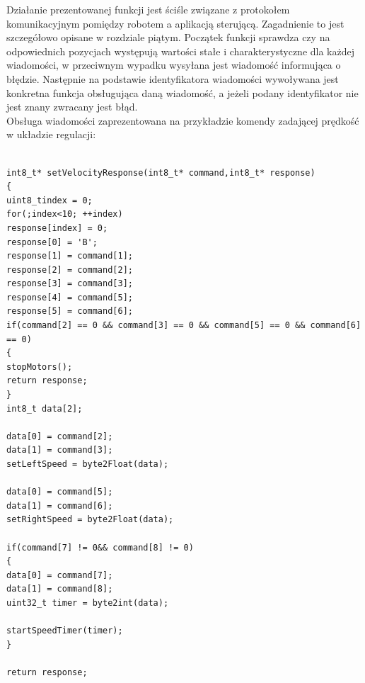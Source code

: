 \documentclass[eng,printmode]{mgr}
\begin{document}
Działanie prezentowanej funkcji jest ściśle związane z protokołem komunikacyjnym pomiędzy robotem a aplikacją sterującą. Zagadnienie to jest szczegółowo opisane w rozdziale piątym. Początek funkcji sprawdza czy na odpowiednich pozycjach występują wartości stałe i charakterystyczne dla każdej wiadomości, w przeciwnym wypadku wysyłana jest wiadomość informująca o błędzie. Następnie na podstawie identyfikatora wiadomości wywoływana jest konkretna funkcja obsługująca daną wiadomość, a jeżeli podany identyfikator nie jest znany zwracany jest błąd. 
\\Obsługa wiadomości zaprezentowana na przykładzie komendy zadającej prędkość w układzie regulacji:
\begin{lstlisting}[style=c]

int8_t* setVelocityResponse(int8_t* command,int8_t* response)
{
uint8_tindex = 0;
for(;index<10; ++index)
response[index] = 0;
response[0] = 'B';
response[1] = command[1];
response[2] = command[2];
response[3] = command[3];
response[4] = command[5];
response[5] = command[6];
if(command[2] == 0 && command[3] == 0 && command[5] == 0 && command[6] == 0)
{
stopMotors();
return response;
}
int8_t data[2];

data[0] = command[2];
data[1] = command[3];
setLeftSpeed = byte2Float(data);

data[0] = command[5];
data[1] = command[6];
setRightSpeed = byte2Float(data);

if(command[7] != 0&& command[8] != 0)
{
data[0] = command[7];
data[1] = command[8];
uint32_t timer = byte2int(data);

startSpeedTimer(timer);
}

return response;
\end{lstlisting}
\end{document}
